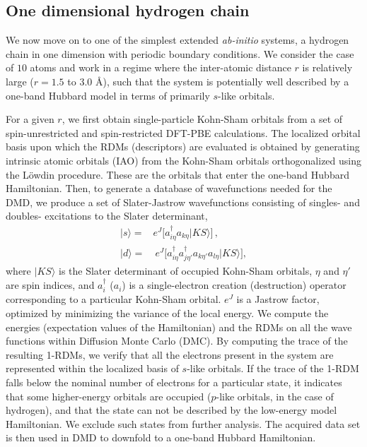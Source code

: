 \subsection{One dimensional hydrogen chain}
\label{subsection:1dhydrogen}
We now move on to one of the simplest extended \emph{ab-initio} systems, a hydrogen chain in one dimension with periodic boundary conditions. 
We consider the case of $10$ atoms and work in a regime where the inter-atomic distance $r$ is 
relatively large ($r=1.5$ to $3.0$ \AA), such that the system is potentially well described by a one-band Hubbard model 
in terms of primarily $s$-like orbitals. 

For a given $r$, we first obtain single-particle Kohn-Sham orbitals from a set of spin-unrestricted and 
spin-restricted DFT-PBE calculations. The localized orbital basis upon which the RDMs (descriptors) 
are evaluated is obtained by generating intrinsic atomic orbitals (IAO) from the Kohn-Sham orbitals 
orthogonalized using the L\"owdin procedure. These are the orbitals that enter the one-band Hubbard Hamiltonian. 
Then, to generate a database of wavefunctions needed for the DMD, we produce a set of Slater-Jastrow 
wavefunctions consisting of singles- and doubles- excitations to the Slater determinant, 
\begin{subequations}
\begin{eqnarray}
| s \rangle = & e^J \Big[a^\dagger_{i \eta} a_{k \eta}   | KS \rangle \Big] \,,\\
| d \rangle = & \: e^J \Big[a^\dagger_{i \eta} a^\dagger_{j \eta'} a_{k \eta'} a_{l \eta}   | KS \rangle\Big] ,
\end{eqnarray}
\end{subequations}
where $|KS\rangle$ is the Slater determinant of occupied Kohn-Sham orbitals, $\eta$ and $\eta'$ are spin indices, 
and $a_{i}^\dagger$ ($a_{i}$) is a single-electron creation (destruction) operator corresponding to a particular Kohn-Sham orbital. $e^J$ is a Jastrow factor, optimized by minimizing the variance of the local energy. 
We compute the energies (expectation values of the Hamiltonian) and the RDMs on all the wave functions within Diffusion Monte Carlo (DMC). 
By computing the trace of the resulting 1-RDMs, we verify that all the electrons present in the system are represented within the localized basis of $s$-like orbitals. If the trace of the 1-RDM falls below the nominal number of electrons for a particular state, it 
indicates that some higher-energy orbitals are occupied ($p$-like orbitals, in the case of hydrogen), and that the state can not be described by the low-energy model Hamiltonian. We exclude such states from further analysis. The acquired data set is then used in DMD to 
downfold to a one-band Hubbard Hamiltonian.%

